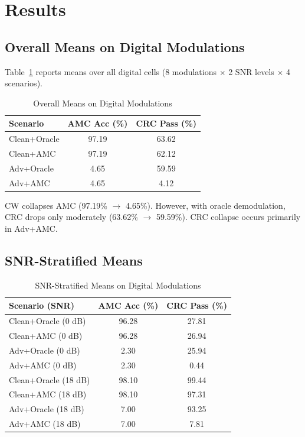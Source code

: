 \section{Results}
\subsection{Overall Means on Digital Modulations}
Table~\ref{tab:overall} reports means over all digital cells (8 modulations $\times$ 2 SNR
levels $\times$ 4 scenarios).

\begin{table}[t]
\caption{Overall Means on Digital Modulations}
\label{tab:overall}
\centering
\begin{tabular}{lcc}
\toprule
Scenario & AMC Acc (\%) & CRC Pass (\%) \\
\midrule
Clean+Oracle & 97.19 & 63.62 \\
Clean+AMC    & 97.19 & 62.12 \\
Adv+Oracle   & 4.65  & 59.59 \\
Adv+AMC      & 4.65  & 4.12  \\
\bottomrule
\end{tabular}
\end{table}

CW collapses AMC (97.19\% $\rightarrow$ 4.65\%). However, with oracle demodulation, CRC drops
only moderately (63.62\% $\rightarrow$ 59.59\%). CRC collapse occurs primarily in Adv+AMC.

\subsection{SNR-Stratified Means}
\begin{table}[t]
\caption{SNR-Stratified Means on Digital Modulations}
\label{tab:snr}
\centering
\begin{tabular}{lcc}
\toprule
Scenario (SNR) & AMC Acc (\%) & CRC Pass (\%) \\
\midrule
Clean+Oracle (0 dB) & 96.28 & 27.81 \\
Clean+AMC (0 dB)    & 96.28 & 26.94 \\
Adv+Oracle (0 dB)   & 2.30  & 25.94 \\
Adv+AMC (0 dB)      & 2.30  & 0.44  \\
\midrule
Clean+Oracle (18 dB) & 98.10 & 99.44 \\
Clean+AMC (18 dB)    & 98.10 & 97.31 \\
Adv+Oracle (18 dB)   & 7.00  & 93.25 \\
Adv+AMC (18 dB)      & 7.00  & 7.81  \\
\bottomrule
\end{tabular}
\end{table}

